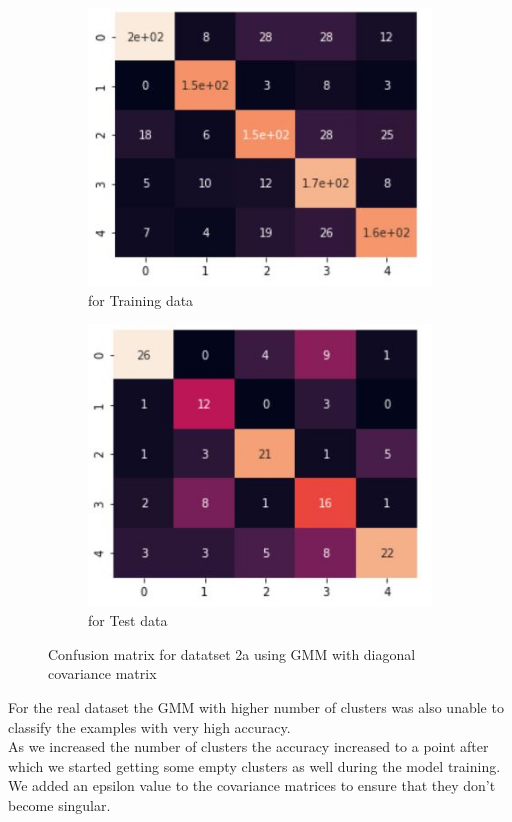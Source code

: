 \documentclass[11pt]{article}
\begin{document}
\begin{figure}[h]
\centering
	\begin{subfigure}[b]{0.45\textwidth}
	\centering
	\includegraphics[scale=0.6]{dataset2a_gmm_diagonal_hm_train.jpg}
	\caption{for Training data}
	\label{fig:fig2.2.3.1}
	\end{subfigure}
	\hfill
	\begin{subfigure}[b]{0.45\textwidth}
	\centering
	\includegraphics[scale=0.6]{dataset2a_gmm_diagonal_hm_test.jpg}
	\caption{for Test data}
	\label{fig:fig2.2.3.2}
	\end{subfigure}
\caption{Confusion matrix for datatset 2a using GMM with diagonal covariance matrix}
\label{fig:fig1.2.1}
\end{figure}

For the real dataset the GMM with higher number of clusters was also unable to classify the examples with very high accuracy. \\
As we increased the number of clusters the accuracy increased to a point after which we started getting some empty clusters as well during the model training.
We added an epsilon value to the covariance matrices to ensure that they don't become singular.
\newpage
\end{document}
